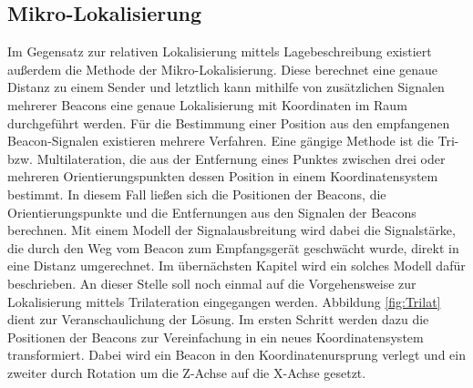\subsection{Mikro-Lokalisierung}
Im Gegensatz zur relativen Lokalisierung mittels Lagebeschreibung existiert außerdem die Methode der Mikro-Lokalisierung. Diese berechnet eine genaue Distanz zu einem Sender und letztlich kann mithilfe von zusätzlichen Signalen mehrerer Beacons eine genaue Lokalisierung mit Koordinaten im Raum durchgeführt werden. Für die Bestimmung einer Position aus den empfangenen Beacon-Signalen existieren mehrere Verfahren. Eine gängige Methode ist die Tri- bzw. Multilateration, die aus der Entfernung eines Punktes zwischen drei oder mehreren Orientierungspunkten dessen Position in einem Koordinatensystem bestimmt. In diesem Fall ließen sich die Positionen der Beacons, die Orientierungspunkte und die Entfernungen aus den Signalen der Beacons berechnen. Mit einem Modell der Signalausbreitung wird dabei die Signalstärke, die durch den Weg vom Beacon zum Empfangsgerät geschwächt wurde, direkt in eine Distanz umgerechnet. Im übernächsten Kapitel wird ein solches Modell dafür beschrieben. An dieser Stelle soll noch einmal auf die Vorgehensweise zur Lokalisierung mittels Trilateration eingegangen werden. Abbildung \ref{fig:Trilat} dient zur Veranschaulichung der Lösung. Im ersten Schritt werden dazu die Positionen der Beacons zur Vereinfachung in ein neues Koordinatensystem transformiert. Dabei wird ein Beacon in den Koordinatenursprung verlegt und ein zweiter durch Rotation um die Z-Achse auf die X-Achse gesetzt.
